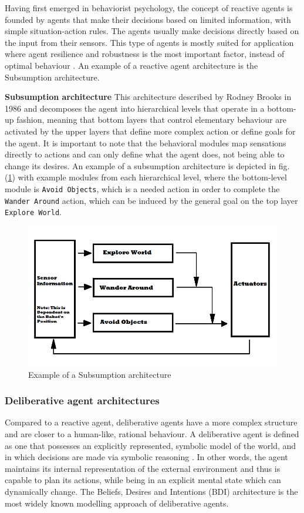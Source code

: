 \documentclass[main.tex]{subfiles}
\begin{document}
Having first emerged in behaviorist psychology, the concept of reactive agents is founded by agents
that make their decisions based on limited information, with simple situation-action rules. The agents
usually make decisions directly based on the input from their sensors. This type of agents is mostly
suited for application where agent resilience and robustness is the most important factor, instead
of optimal behaviour \cite{Anthony2014}. An example of a reactive agent architecture is the Subsumption architecture.

\textbf{Subsumption architecture}\newline
This architecture described by Rodney Brooks in 1986 \cite{1087032} and
decomposes the agent into hierarchical levels that operate in a bottom-up
fashion, meaning that bottom layers that control elementary behaviour are
activated by the upper layers that define more complex action or define goals for
the agent. It is important to note that the behavioral modules map sensations
directly to actions and can only define what the agent does, not being able to
change its desires. An example of a subsumption architecture is depicted in fig.
(\ref{Subsumption}) with example modules from each hierarchical level, where the
bottom-level module is \texttt{Avoid Objects}, which is a needed action in order
to complete the \texttt{Wander Around} action, which can be induced by the
general goal on the top layer \texttt{Explore World}.

\begin{figure}[htbp]
    \centering
    \includegraphics[width = .6\textwidth]{Subsumption_Architecture_Abstract_Diagram.png}
    \caption{Example of a Subsumption architecture \cite{Brooks1999}}
    \label{Subsumption}
\end{figure}

\subsubsection{Deliberative agent architectures}

Compared to a reactive agent, deliberative agents have a more complex structure and are closer to a
human-like, rational behaviour. A deliberative agent is defined as one that
possesses an explicitly represented, symbolic model of the world, and in which
decisions are made via symbolic reasoning \cite{Wooldridge1996}. In other words,
the agent maintains its internal representation of the external environment and
thus is capable to plan its actions, while being in an explicit mental state which
can dynamically change. The Beliefs, Desires and Intentions (BDI) architecture
is the most widely known modelling approach of deliberative agents.
\end{document}
